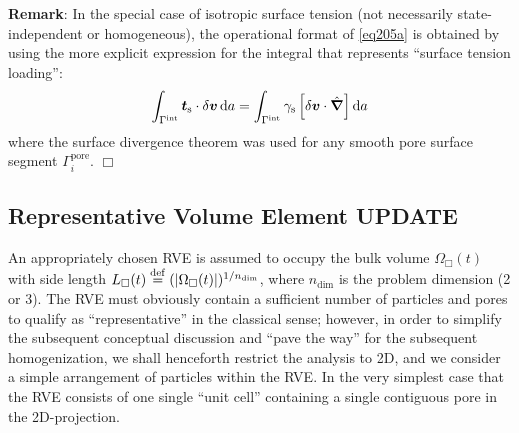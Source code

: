 \documentclass[10pt,a4paper]{article}
\newcommand{\pore}{\mathrm{pore}}
\newcommand{\internal}{\mathrm{int}}
\newcommand{\surf}{\mathrm{s}}
\newcommand{\NDIM}{n_\mathrm{dim}}
\begin{document}
\textbf{Remark}: In the special case of isotropic surface tension (not necessarily state-independent or homogeneous), the operational format of \eqref{eq205a} is obtained by using the more explicit expression for the integral that represents ``surface tension loading'':
\begin{equation}
    \int_{\Gamma^\internal} \ta{t}_\surf \cdot \delta\ta{v} \dif a =
    \int_{\Gamma^\internal} \gamma_\surf\left[\delta\ta{v}\cdot\hat{\diff}\right] \dif a
\label{eq206}
\end{equation}
where the surface divergence theorem was used for any smooth pore surface segment $\Gamma^\pore_i$. $\Box$

\subsection{Representative Volume Element \textbf{UPDATE}}

An appropriately chosen RVE is assumed to occupy the bulk volume $\Omega_\Box(t)$ with side length $L_\Box(t)\defeq(|\Omega_\Box(t)|)^{1/\NDIM}$, where $\NDIM$ is the problem dimension (2 or 3). The RVE must obviously contain a sufficient number of particles and pores to qualify as ``representative'' in the classical sense; however, in order to simplify the subsequent conceptual discussion and ``pave the way'' for the subsequent homogenization, we shall henceforth restrict the analysis to 2D, and we consider a simple arrangement of particles within the RVE. In the very simplest case that the RVE consists of one single ``unit cell'' containing a single contiguous pore in the 2D-projection.
\end{document}

